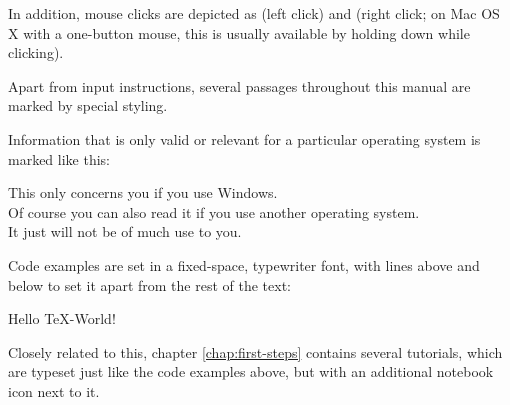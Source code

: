 In addition, mouse clicks are depicted as {\LMB} (left click) and {\RMB} (right click; on Mac OS X with a one-button mouse, this is usually available by holding down {\Ctrl} while clicking).

Apart from input instructions, several passages throughout this manual are marked by special styling.

Information that is only valid or relevant for a particular operating system is marked like this:
\begin{OSWindows}
\noindent This only concerns you if you use Windows. \\
Of course you can also read it if you use another operating system. \\
It just will not be of much use to you.
\end{OSWindows}

\bigskip
Code examples are set in a fixed-space, typewriter font, with lines above and below to set it apart from the rest of the text:
\begin{verbExample}
Hello \TeX-World!
\end{verbExample}

Closely related to this, chapter \ref{chap:first-steps} contains several tutorials, which are typeset just like the code examples above, but with an additional notebook icon next to it.